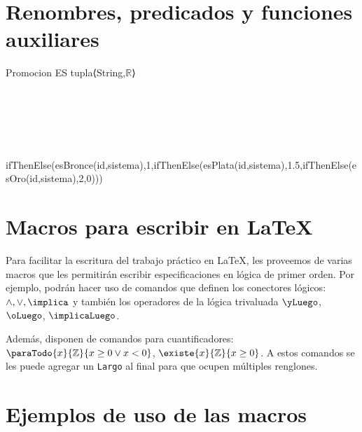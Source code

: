 \documentclass[11pt,a4paper]{article}
\begin{document}
\maketitle

\section{Renombres, predicados y funciones auxiliares}
Promocion ES  tupla⟨String,$\mathbb{R}$⟩

\\
\\
\\
\\
\\{ifThenElse(esBronce(id,sistema),1,ifThenElse(esPlata(id,sistema),1.5,ifThenElse(esOro(id,sistema),2,0)))}


\section{Macros para escribir en LaTeX}

Para facilitar la escritura del trabajo práctico en LaTeX, les proveemos de varias macros que les permitirán escribir especificaciones en lógica de primer orden.
Por ejemplo, podrán hacer uso de comandos que definen los conectores lógicos: $\land, \lor, \implica$ y también los operadores de la lógica trivaluada $\yLuego$, $\oLuego$, $\implicaLuego$.

Además, disponen de comandos para cuantificadores: $\paraTodo{x}{\mathbb{Z}}{x \geq 0 \lor x < 0}$, $\existe{x}{\mathbb{Z}}{x \geq 0}$. A estos comandos se les puede agregar un \texttt{Largo} al final para que ocupen múltiples renglones.

\section{Ejemplos de uso de las macros}
\end{document}
